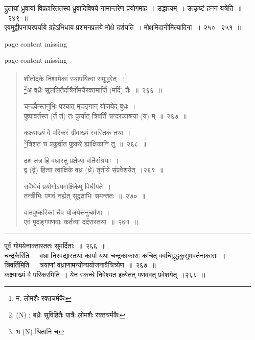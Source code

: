 \documentclass[11pt, openany]{book}
\begin{document}
द्रुतायां ध्रुवायां विप्रहारिततस्य ध्रुवादिविषये नामान्तरेण प्रयोगमाह~। उद्धात्यम्~। उत्कृष्टं हननं यत्रेति~॥~२४९~॥\\

एवमुद्वीपनापरपर्याये ग्रहेऽभिधाय प्रशमनप्रलये मोक्षे दर्शयति~। मोक्षमिदानीमित्यादिना~॥~२५० \textendash\ २५१~॥

\newpage
page  content missing

\newpage
page content missing

\newpage

\begin{quote}
{\na  शीतोदके निशामेकां स्थापयित्वा समुद्धरेत्~।\renewcommand{\thefootnote}{1}\footnote{म. लोमशैः रक्तचर्मकैः}\\
\renewcommand{\thefootnote}{1a}\footnote{(N) : बध्रैः सुविहितैः पात्रैः लोमशैः रक्तचर्मकैः}अ वध्रैः सुललितैर्दात्रैर्गोमयैरक्तमार्जि (मर्दि) तैः~॥~२६६~॥

 चन्द्रकैस्तनुभिः पश्चात् मृदङ्गान् योजयेद् बुधः~।\\
 पुष्पावर्तस्त (र्तं तं) तः कुर्यात् त्रिवर्तिं चन्दरकाश्रया (य) म्~॥~२६७~॥

 कक्ष्याख्यं वै परिकरं ग्रीवाख्यं स्वस्तिकं तथा~।\\
 \renewcommand{\thefootnote}{2}\footnote{भ (N) श्रितानि च}त्रिशतं च प्रकुर्वीत पुष्करे ह्याक्षिकानि तु~॥~२६८~॥

 दश तत्र हि वध्रास्तु प्रक्षेप्या वर्तिसंश्रयाः~।\\
 द्व (द्वे) हित्वा त्वाक्षिके वध्र (ध्रे) तृतीये संप्रवेशयेत्~।२६९~॥

 सर्वेष्वेवं प्रयोगोऽयमाक्षिकेषु विधीयते~।\\
 तन्त्रीभिः पणवं नह्येत् सुदृढाभिः समन्ततः~॥~२७०~॥

 वातपुष्करिकां चैव योजयेत्तनुचर्मणा~।\\
 एवं मृदङ्गपणवाः कर्तव्या दर्दरास्तथा~॥~२७१~॥}
\end{quote}

\hrule

\vspace{2mm}
पूर्वं गोमयेनाक्तास्ततः सुमर्दिताः~॥~२६६~॥\\

{\qtt चन्द्रकैरिति}~। वध्रा निरवद्यास्तथा कार्या यथा चन्द्रकाकाराः कचित् क्वचिद्वृद्धकुसुमवर्तनाकाराः~। त्रिवर्तिमिति~। त्रयाणां वध्राणामन्योन्ययोजनावैचित्र्येण~॥~२६७~॥\\

कक्ष्याख्यं वै परिकरमिति~। येन स्कन्धे निवेश्यत इत्येतत् पणववत् प्रवेशयेत्~।२६८~॥\\
\end{document}

